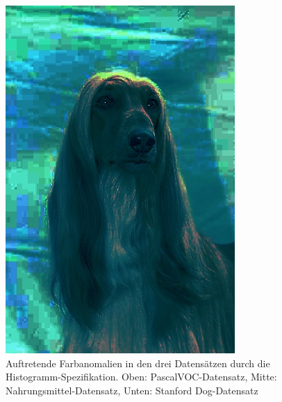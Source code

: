 \begin{appendices}
\begin{figure}[htb]
\begin{minipage}{0.19\textwidth}
\end{minipage}
\begin{minipage}{0.19\textwidth}
\includegraphics[width=\textwidth]{images/anomalien/HS/n02088094_1406.jpg}
\end{minipage}
\caption{Auftretende Farbanomalien in den drei Datensätzen durch die Histogramm-Spezifikation. Oben: PascalVOC-Datensatz, Mitte: Nahrungsmittel-Datensatz, Unten: Stanford Dog-Datensatz}
\label{img:anoHS}
\end{figure}


\end{appendices}
